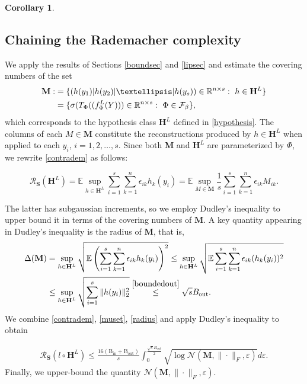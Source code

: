 \documentclass[preprint,12pt]{elsarticle}
\newtheorem{corollary}[theorem]{Corollary}
\begin{document}
\begin{corollary}
\end{corollary}
\subsection{Chaining the Rademacher complexity}\label{chain}

We apply the results of Sections \ref{boundsec} and \ref{lipsec} and estimate the covering numbers of the set
\begin{align}\label{mset}
    \mathbf{M}:&=\{(h(y_1)|h(y_2)|\dots|h(y_s))\in\mathbb{R}^{n\times s}:\ h\in \mathbf{H}^{L}\}\notag\\
    &=\{\sigma(T_\Phi((f^L_\Phi(Y)))\in\mathbb{R}^{n\times s}:\ \Phi\in\mathcal{F}_{\beta }\},
\end{align}
which corresponds to the hypothesis class $\mathbf{H}^L$ defined in \eqref{hypothesis}. The columns of each $M\in\mathbf{M}$ constitute the reconstructions produced by $h\in\mathbf{H}^L$ when applied to each $y_i$, $i=1,2,\hdots,s$. Since both $\mathbf{M}$ and $\mathbf{H}^L$ are parameterized by $\Phi$, we rewrite \eqref{contradem} as follows:

\begin{equation}\label{muset}
    \mathcal{R}_\mathbf{S}(\mathbf{H}^L)=\mathbb{E}\sup_{h\in\mathbf{H}^L}\sum_{i=1}^s\sum_{k=1}^n\epsilon_{ik}h_k(y_i)=\mathbb{E}\sup_{M\in\mathbf{M}}\frac{1}{s}\sum_{i=1}^{s}\sum_{k=1}^n\epsilon_{ik}M_{ik}.
\end{equation}

The latter has subgaussian increments, so we employ Dudley's inequality \cite[Theorem 8.23]{rf} to upper bound it in terms of the covering numbers of $\mathbf{M}$. A key quantity appearing in Dudley's inequality is the radius of $\mathbf{M}$, that is,
\begin{align}
    \Delta(\mathbf{M})&=\sup_{h\in\mathbf{H}^L}\sqrt{\mathbb{E}\left(\sum_{i=1}^{s}\sum_{k=1}^n\epsilon_{ik}h_k(y_i)\right)^2}\leq\sup_{h\in\mathbf{H}^L}\sqrt{\mathbb{E}\sum_{i=1}^{s}\sum_{k=1}^n\epsilon_{ik}(h_k(y_i))^2}\notag\\
    \label{radius}
    &\leq\sup_{h\in\mathbf{H}^L}\sqrt{\sum_{i=1}^{s}\|h(y_i)\|_2^2}\overset{\eqref{boundedout}}{\leq}\sqrt{s}B_{\mathrm{out}}.
\end{align}
We combine \eqref{contradem}, \eqref{muset}, \eqref{radius} and apply Dudley's inequality to obtain

\begin{equation}\label{dudleys}
\begin{split}
    \mathcal{R}_\mathbf{S}(l\circ\mathbf{H}^L)\leq\frac{16(\mathrm{B_{in}}+\mathrm{B_{out}})}{s}\int_0^{\frac{\sqrt{s}B_{\mathrm{out}}}{2}}\sqrt{\log\mathcal{N}(\mathbf{M},\|\cdot\|_F,\varepsilon)}d\varepsilon.
\end{split}
\end{equation}
Finally, we upper-bound the quantity $\mathcal{N}(\mathbf{M},\|\cdot\|_F,\varepsilon)$.
\end{document}
